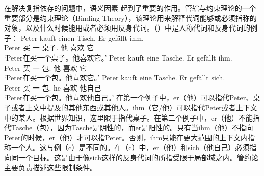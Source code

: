 在解决复指依存的问题中，语义因素\label{Seite-Bindungstheorie} 起到了重要的作用。管辖与约束理论的一个重要部分是约束理论（Binding Theory），该理论用来解释代词能够或必须指称的对象，以及什么时候能用或者必须用反身代词。（）中是人称代词和反身代词的例子：
\eal
\ex 
\gll Peter kauft einen Tisch. Er gefällt ihm.\\
	 Peter 买 一 桌子.\mas{} 他 喜欢 它\\
\glt `Peter在买一个桌子。他喜欢它。'
\ex 
\gll Peter kauft eine Tasche. Er gefällt ihm.\\
	 Peter 买 一 包.\fem{} 他 喜欢 它\\
\glt `Peter在买一个包。他喜欢它。'
\ex 
\gll Peter kauft eine Tasche. Er gefällt sich.\\
	 Peter 买 一 包.\fem{} he 喜欢 他自己\\
\glt `Peter在买一个包。他喜欢他自己。'
\zl
在第一个例子中，er（他）可以指代Peter、桌子或者上文中提及的其他东西或其他人。ihm（它/他）可以指代Peter或者上下文中的某人。根据世界知识，这里限于指代桌子。在第二个例子中，er（他）不能指代Tasche（包），因为Tasche是阴性的，而er是阳性的。只有当ihm（他）不指向Peter的时候，er（他）才可以指Peter。否则，ihm只能在更大范围的上下文内指称一个人。这与例（c）是不同的。在（c）中，er（他）和sich（他自己）必须指向同一个目标。这是由于像sich这样的反身代词的所指受限于局部域之内。管约论主要负责描述这些限制条件。

